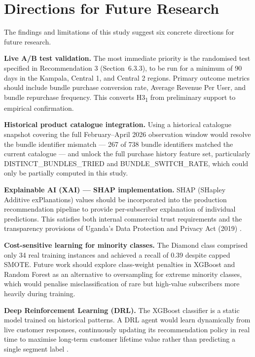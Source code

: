 \section{Directions for Future Research}

The findings and limitations of this study suggest six concrete directions for
future research.

\textbf{Live A/B test validation.} The most immediate priority is the randomised
test specified in Recommendation 3 (Section~6.3.3), to be run for a minimum of
90 days in the Kampala, Central 1, and Central 2 regions. Primary outcome metrics
should include bundle purchase conversion rate, Average Revenue Per User, and
bundle repurchase frequency. This converts H3\textsubscript{1} from preliminary
support to empirical confirmation.

\textbf{Historical product catalogue integration.} Using a historical catalogue
snapshot covering the full February--April 2026 observation window would resolve
the bundle identifier mismatch --- 267 of 738 bundle identifiers matched the
current catalogue --- and unlock the full purchase history feature set, particularly
DISTINCT\_BUNDLES\_TRIED and BUNDLE\_SWITCH\_RATE, which could only be partially
computed in this study.

\textbf{Explainable AI (XAI) --- SHAP implementation.} SHAP (SHapley Additive
exPlanations) values \cite{ref_shap} should be incorporated into the production
recommendation pipeline to provide per-subscriber explanation of individual
predictions. This satisfies both internal commercial trust requirements and the
transparency provisions of Uganda's Data Protection and Privacy Act (2019)
\cite{ref47}.

\textbf{Cost-sensitive learning for minority classes.} The Diamond class comprised
only 34 real training instances and achieved a recall of 0.39 despite capped SMOTE.
Future work should explore class-weight penalties in XGBoost and Random Forest as
an alternative to oversampling for extreme minority classes, which would penalise
misclassification of rare but high-value subscribers more heavily during training.

\textbf{Deep Reinforcement Learning (DRL).} The XGBoost classifier is a static
model trained on historical patterns. A DRL agent would learn dynamically from
live customer responses, continuously updating its recommendation policy in real
time to maximise long-term customer lifetime value rather than predicting a single
segment label \cite{ref19}.

